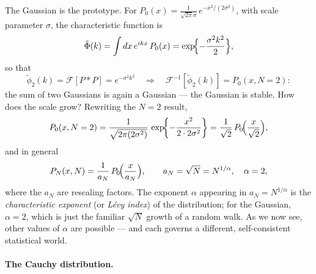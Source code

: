 The Gaussian is the prototype.
For $P_0(x) = \frac{1}{\sqrt{2\pi}\sigma}\, e^{-x^2/(2\sigma^2)}$, with scale parameter $\sigma$, the characteristic function is
\begin{equation}
\tilde\Phi(k) = \int dx\, e^{ikx}\, P_0(x) = \exp\!\Bigl\{-\frac{\sigma^2 k^2}{2}\Bigr\},
\end{equation}
so that
\begin{equation}
\tilde\phi_2(k) = \mathcal{F}[P*P] = e^{-\sigma^2 k^2} \quad\Longrightarrow\quad \mathcal{F}^{-1}[\tilde\phi_2(k)] = P_0(x, N=2):
\end{equation}
the sum of two Gaussians is again a Gaussian --- the Gaussian is stable.
How does the scale grow?
Rewriting the $N=2$ result,
\begin{equation}
P_0(x, N=2) = \frac{1}{\sqrt{2\pi(2\sigma^2)}}\, \exp\!\biggl\{-\frac{x^2}{2\cdot 2\sigma^2}\biggr\} = \frac{1}{\sqrt{2}}\,P_0\!\Bigl(\frac{x}{\sqrt{2}}\Bigr),
\end{equation}
and in general
\begin{equation}
P_N(x, N) = \frac{1}{a_N}\, P_0\!\Bigl(\frac{x}{a_N}\Bigr), \qquad a_N = \sqrt{N} = N^{1/\alpha}, \quad \alpha = 2,
\end{equation}
where the $a_N$ are rescaling factors.
The exponent $\alpha$ appearing in $a_N = N^{1/\alpha}$ is the \emph{characteristic exponent} (or \emph{L\'evy index}) of the distribution; for the Gaussian, $\alpha=2$, which is just the familiar $\sqrt{N}$ growth of a random walk.
As we now see, other values of $\alpha$ are possible --- and each governs a different, self-consistent statistical world.

\paragraph*{The Cauchy distribution.}

